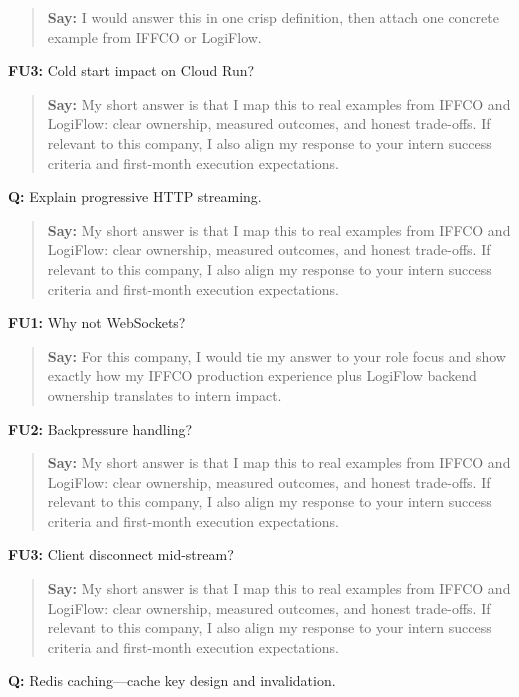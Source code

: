 \documentclass[9pt,a4paper]{article}
\begin{document}
\begin{quote}\small\textbf{Say:} I would answer this in one crisp definition, then attach one concrete example from IFFCO or LogiFlow.\end{quote}
\vspace{2mm}
\textbf{FU3:} Cold start impact on Cloud Run?

\begin{quote}\small\textbf{Say:} My short answer is that I map this to real examples from IFFCO and LogiFlow: clear ownership, measured outcomes, and honest trade-offs. If relevant to this company, I also align my response to your intern success criteria and first-month execution expectations.\end{quote}
\vspace{2mm}
\textbf{Q:} Explain progressive HTTP streaming.

\begin{quote}\small\textbf{Say:} My short answer is that I map this to real examples from IFFCO and LogiFlow: clear ownership, measured outcomes, and honest trade-offs. If relevant to this company, I also align my response to your intern success criteria and first-month execution expectations.\end{quote}
\vspace{2mm}
\textbf{FU1:} Why not WebSockets?

\begin{quote}\small\textbf{Say:} For this company, I would tie my answer to your role focus and show exactly how my IFFCO production experience plus LogiFlow backend ownership translates to intern impact.\end{quote}
\vspace{2mm}
\textbf{FU2:} Backpressure handling?

\begin{quote}\small\textbf{Say:} My short answer is that I map this to real examples from IFFCO and LogiFlow: clear ownership, measured outcomes, and honest trade-offs. If relevant to this company, I also align my response to your intern success criteria and first-month execution expectations.\end{quote}
\vspace{2mm}
\textbf{FU3:} Client disconnect mid-stream?

\begin{quote}\small\textbf{Say:} My short answer is that I map this to real examples from IFFCO and LogiFlow: clear ownership, measured outcomes, and honest trade-offs. If relevant to this company, I also align my response to your intern success criteria and first-month execution expectations.\end{quote}
\vspace{2mm}
\textbf{Q:} Redis caching---cache key design and invalidation.
\end{document}
